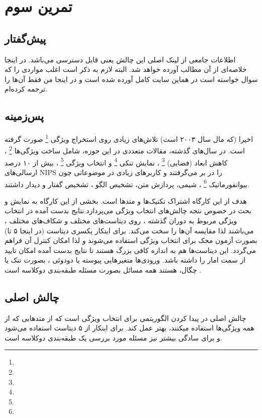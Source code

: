 \documentclass[a4paper, 12pt]{article}
\begin{document}
\section*{تمرین سوم}

\subsection*{پیش‌گفتار}
اطلاعات جامعی از لینک اصلی این چالش یعنی
\href{http://clopinet.com/isabelle/Projects/NIPS2003/#challenge}{}
قابل دسترسی می‌باشد. در اینجا خلاصه‌ای از آن مطالب آورده خواهد شد. البته لازم به ذکر است اغلب مواردی را که سوال خواسته است در هماین سایت کامل آورده شده است و در اینجا من فقط آن‌ها را ترجمه کرده‌ام.

\subsection*{پس‌زمینه}
اخیرا (که مال سال ۲۰۰۳ است) تلاش‌های زیادی روی استخراج ویژگی 
\footnote{}
صورت گرفته است. در سال‌های گذشته، مقالات متعددی در این حوزه، شامل ساخت ویژگی‌ها
\footnote{}
، کاهش ابعاد (فضایی)
\footnote{}
، نمایش تنکی
\footnote{}
و انتخاب ویژگی
\footnote{}
 ، بیش از ۱۰ درصد ارسالی‌های NIPS را در بر می‌گرفتند و کاربر‌های زیادی در موضوعاتی چون بیوانفورماتیک 
 \footnote{}
 ، شیمی، پردازش متن، تشخیص الگو ، تشخیص گفتار و دیدار داشتند.
 
 هدف از این کارگاه اشتراک تکنیک‌ها و متد‌ها است.  بخشی از این کارگاه به نمایش و بحث در خصوص نتجه چالش‌های انتخاب ویژگی می‌پردازد.نتایج بدست آمده در انتخاب ویژگی مربوط به دوران گذشته ، روی دیتاست‌های مختلف و شکاف‌های مختلف ، می‌باشند لذا مقایسه آن‌ها را سخت می‌کند.  برای اینکار یکسری دیتاست (در اینجا ۵ تا)  بصورت آزمون محک برای انتخاب ویژگی استفاده می‌شوند و لذا امکان کنترل آن‌ فراهم می‌گردد. این دیتاست‌ها هم به اندازه کافی بزرگ هستند تا نتایج بدست آمده امکان تایید از سمت امار را داشته باشد. ورودی‌ها متغیر‌هایی پیوسته یا دودوئی ، بصورت تنک یا چگال، هستند  همه مسائل بصورت مسئله طبقه‌بندی دوکلاسه است . 
 
 \subsection*{چالش اصلی}
 چالش اصلی در پیدا کردن الگوریتمی برای انتخاب ویژگی است که از متد‌هایی که از همه ویژگی‌ها استفاده میکنند، بهتر عمل کند. برای اینکار از ۵ دیتاست استفاده می‌شود و برای سادگی بیشتر نیز مسئله مورد بررسی یک طبقه‌بندی دوکلاسه‌ است. 
 
\end{document}
